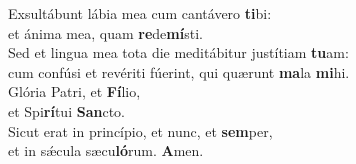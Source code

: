 \oddverse Exsultábunt lábia mea cum cantávero \textbf{ti}bi:~\*\\
\oddverse et ánima mea, quam \textbf{re}de\textbf{mí}sti.\\
\evenverse Sed et lingua mea tota die meditábitur justítiam \textbf{tu}am:~\*\\
\evenverse cum confúsi et revériti fúerint, qui quærunt \textbf{ma}la \textbf{mi}hi.\\
\oddverse Glória Patri, et \textbf{Fí}lio,~\*\\
\oddverse et Spi\textbf{rí}tui \textbf{San}cto.\\
\evenverse Sicut erat in princípio, et nunc, et \textbf{sem}per,~\*\\
\evenverse et in sǽcula sæcu\textbf{ló}rum. \textbf{A}men.\\
